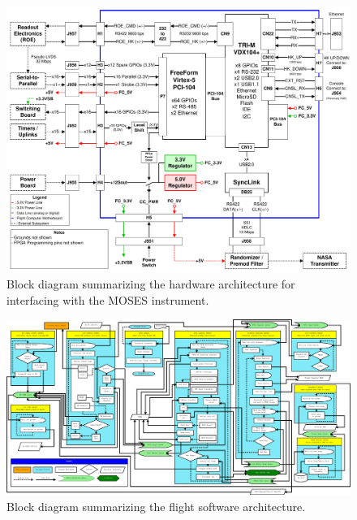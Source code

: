 \documentclass[11pt,titlepage]{article}
\begin{document}


\begin{landscape}
\begin{figure}[h!]
\centering
\includegraphics[width=22.5cm]{images/hw_block}
\caption{Block diagram summarizing the hardware architecture for interfacing with the MOSES instrument.}
\end{figure}
\end{landscape}


\begin{landscape}
\begin{figure}[h!]
\centering
\includegraphics[width=24.5cm]{images/mfsw_block}
\caption{Block diagram summarizing the flight software architecture.}
\end{figure}
\end{landscape}









\end{document}

